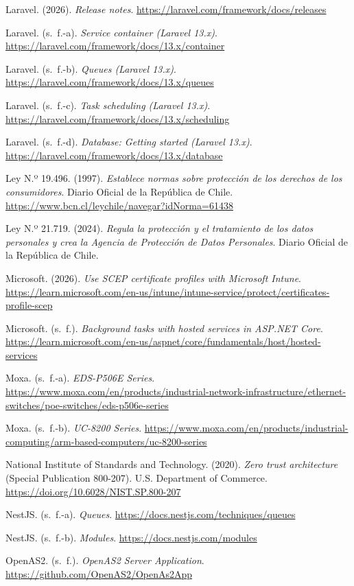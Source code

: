 \begin{list}{}{\setlength{\leftmargin}{1.27cm}\setlength{\itemindent}{-1.27cm}\setlength{\itemsep}{0.5\baselineskip}\raggedright}
\item Laravel. (2026). \textit{Release notes}. \url{https://laravel.com/framework/docs/releases}
\item Laravel. (s.~f.-a). \textit{Service container (Laravel 13.x)}. \url{https://laravel.com/framework/docs/13.x/container}
\item Laravel. (s.~f.-b). \textit{Queues (Laravel 13.x)}. \url{https://laravel.com/framework/docs/13.x/queues}
\item Laravel. (s.~f.-c). \textit{Task scheduling (Laravel 13.x)}. \url{https://laravel.com/framework/docs/13.x/scheduling}
\item Laravel. (s.~f.-d). \textit{Database: Getting started (Laravel 13.x)}. \url{https://laravel.com/framework/docs/13.x/database}
\item Ley N.º 19.496. (1997). \textit{Establece normas sobre protección de los derechos de los consumidores}. Diario Oficial de la República de Chile. \url{https://www.bcn.cl/leychile/navegar?idNorma=61438}
\item Ley N.º 21.719. (2024). \textit{Regula la protección y el tratamiento de los datos personales y crea la Agencia de Protección de Datos Personales}. Diario Oficial de la República de Chile.
\item Microsoft. (2026). \textit{Use SCEP certificate profiles with Microsoft Intune}. \url{https://learn.microsoft.com/en-us/intune/intune-service/protect/certificates-profile-scep}
\item Microsoft. (s.~f.). \textit{Background tasks with hosted services in ASP.NET Core}. \url{https://learn.microsoft.com/en-us/aspnet/core/fundamentals/host/hosted-services}
\item Moxa. (s.~f.-a). \textit{EDS-P506E Series}. \url{https://www.moxa.com/en/products/industrial-network-infrastructure/ethernet-switches/poe-switches/eds-p506e-series}
\item Moxa. (s.~f.-b). \textit{UC-8200 Series}. \url{https://www.moxa.com/en/products/industrial-computing/arm-based-computers/uc-8200-series}
\item National Institute of Standards and Technology. (2020). \textit{Zero trust architecture} (Special Publication 800-207). U.S. Department of Commerce. \url{https://doi.org/10.6028/NIST.SP.800-207}
\item NestJS. (s.~f.-a). \textit{Queues}. \url{https://docs.nestjs.com/techniques/queues}
\item NestJS. (s.~f.-b). \textit{Modules}. \url{https://docs.nestjs.com/modules}
\item OpenAS2. (s.~f.). \textit{OpenAS2 Server Application}. \url{https://github.com/OpenAS2/OpenAs2App}

\end{list}
